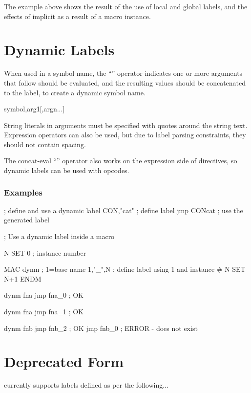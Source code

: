 The example above shows the result of the use of local and global labels, and the effects of implicit  as a result of a macro instance.

\section{Dynamic Labels}
\label{todo}

When used in a symbol name, the ``\mono{,}'' operator indicates one or more
arguments that follow should be evaluated, and the resulting values 
should be concatenated to the label, to create a dynamic symbol name. 

\begin{usage}
symbol,arg1[,argn...]
\end{usage}

String literals in arguments must be specified with quotes around the string
text.  Expression operators can also be used, but due to label
parsing constraints, they should not contain spacing.

The concat-eval ``\mono{,}'' operator also works on the expression side
of  directives, so dynamic labels can be used with opcodes. 

\subsubsection{Examples}

\begin{code}
; define and use a dynamic label
CON,"cat"               ; define label
        jmp CONcat      ; use the generated label
\end{code}

\begin{code}
; Use a dynamic label inside a macro

N SET 0         ; instance number

  MAC dynm      ; {1}=base name
{1},"_",N       ; define label using {1} and instance #
N SET N+1
  ENDM

  dynm fna
  jmp fna_0     ; OK

  dynm fna
  jmp fna_1     ; OK
  
  dynm fnb
  jmp fnb_2     ; OK
  jmp fnb_0     ; ERROR - does not exist
\end{code}

\section{Deprecated Form}
\label{changelog:20200907deprecated}
\dasm currently supports labels defined as per the following...

